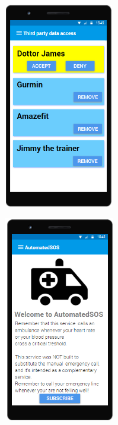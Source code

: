 \begin{figure}[H]
\centering
\begin{minipage}{.5\textwidth}
  \centering
  \includegraphics[width=5cm,height=9cm]{resources/Screen/ThirdPartyManagementIndividual.png}
  \label{fig:App ThirdParty Management}
\end{minipage}%
\begin{minipage}{.5\textwidth}
  \centering
  \includegraphics[width=5cm,height=9cm]{resources/Screen/AutomatedSOSIndividual.png}
  \label{fig:App AutomatedSOS}
\end{minipage}
\end{figure}


